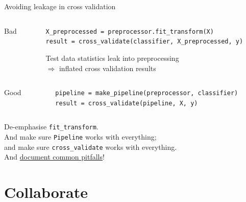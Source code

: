 \documentclass[aspectratio=169, 22pt]{beamer}
\newcommand{\hl}{\textcolor{usydred}}
\begin{document}
\begin{plain}{Avoiding leakage in cross validation}
	\begin{columns}[t]\begin{column}{0.1\textwidth}Bad\end{column}\begin{column}{.9\textwidth}
\verb|X_preprocessed = preprocessor.fit_transform(X)|\\
\verb|result = cross_validate(classifier, X_preprocessed, y)|

	\vspace{1em}
Test data statistics \hl{leak} into preprocessing\\
	$\Rightarrow$ inflated cross validation results
	\end{column}\end{columns}
	\vspace{1em}

	\begin{columns}[t]\begin{column}{0.1\textwidth}Good\end{column}\begin{column}{.9\textwidth}
\verb|pipeline = make_pipeline(preprocessor, classifier)|\\
\verb|result = cross_validate(pipeline, X, y)|
	\end{column}\end{columns}

	\vfill
	\pause
	\begin{itemize}
			\p[Solution] De-emphasise \verb|fit_transform|.\\
			And make sure \verb|Pipeline| works with everything;\\
			and make sure \verb|cross_validate| works with everything.\\
			And \href{https://scikit-learn.org/dev/common_pitfalls.html}{document common pitfalls}!
	\end{itemize}
\end{plain}


\section{Collaborate}
\end{document}
